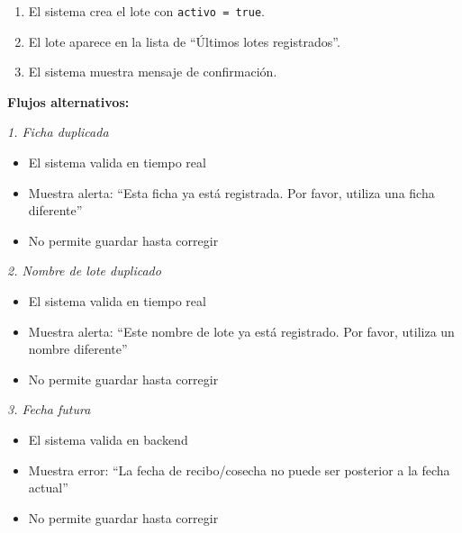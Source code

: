 \begin{enumerate}[nosep]
\begin{itemize}[nosep]
        \item La ficha no esté duplicada
        \item El nombre del lote no esté duplicado
        \item La fecha de recibo no sea futura
        \item La fecha de cosecha no sea futura
    \end{itemize}
    \item El sistema crea el lote con \texttt{activo = true}.
    \item El lote aparece en la lista de ``Últimos lotes registrados''.
    \item El sistema muestra mensaje de confirmación.
\end{enumerate}

\vspace{0.5em}
\noindent\textbf{Flujos alternativos:}

\vspace{0.3em}
\noindent\textit{1. Ficha duplicada}
\begin{itemize}[nosep]
    \item El sistema valida en tiempo real
    \item Muestra alerta: ``Esta ficha ya está registrada. Por favor, utiliza una ficha diferente''
    \item No permite guardar hasta corregir
\end{itemize}

\vspace{0.3em}
\noindent\textit{2. Nombre de lote duplicado}
\begin{itemize}[nosep]
    \item El sistema valida en tiempo real
    \item Muestra alerta: ``Este nombre de lote ya está registrado. Por favor, utiliza un nombre diferente''
    \item No permite guardar hasta corregir
\end{itemize}

\vspace{0.3em}
\noindent\textit{3. Fecha futura}
\begin{itemize}[nosep]
    \item El sistema valida en backend
    \item Muestra error: ``La fecha de recibo/cosecha no puede ser posterior a la fecha actual''
    \item No permite guardar hasta corregir
\end{itemize}

